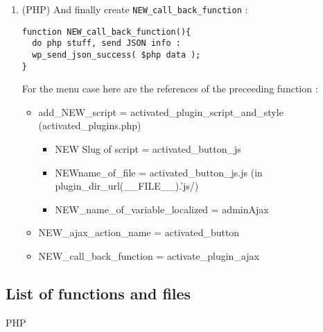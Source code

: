 \documentclass[11pt]{article}
\begin{document}
\begin{enumerate}
\item (PHP) And finally create \texttt{NEW\_call\_back\_function} :
\begin{lstlisting}
function NEW_call_back_function(){		
  do php stuff, send JSON info :
  wp_send_json_success( $php data );
}
\end{lstlisting}



For the menu case here are the references of the preceeding function : 
\begin{itemize}
\item add\_NEW\_script = activated\_plugin\_script\_and\_style (activated\_plugins.php)
\begin{itemize}
\item  NEW Slug of script = activated\_button\_js 
\item NEWname\_of\_file = activated\_button\_js.js (in plugin\_dir\_url(\_\_FILE\_\_).'js/)
\item NEW\_name\_of\_variable\_localized = adminAjax
\end{itemize}
\item NEW\_ajax\_action\_name = activated\_button 
\item NEW\_call\_back\_function = activate\_plugin\_ajax
\end{itemize}





\end{enumerate}


\subsection{List of functions and files}

PHP 
\end{document}
